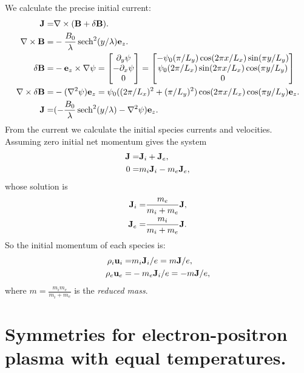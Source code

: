 \documentclass[12pt,fleqn]{article}
\numberwithin{equation}{section}
\begin{document}
We calculate the precise initial current:
\begin{align*}
     \mathbf{J} =& \nabla\times (\mathbf{B} + \delta\mathbf{B}).
\\ \nabla\times\mathbf{B} =& -\frac{B_0}{\lambda}\,\mathrm{sech}^2(y/\lambda) \mathbf{e}_z.
\\ \delta\mathbf{B}=&-\mathbf{e}_z\times\nabla \psi
   =  \begin{bmatrix}
        \partial_y \psi \\
       -\partial_x \psi \\
        0
      \end{bmatrix}
   =  \begin{bmatrix}
        -\psi_0(\pi/L_y) \cos(2\pi x/L_x) \sin(\pi y/L_y)  \\
         \psi_0(2\pi/L_x) \sin(2\pi x/L_x) \cos(\pi y/L_y) \\
        0
      \end{bmatrix}
\\ \nabla\times\delta\mathbf{B} =& -(\nabla^2\psi)\mathbf{e}_z
       =  \psi_0 ((2\pi/L_x)^2+(\pi/L_y)^2) \cos(2\pi x/L_x) \cos(\pi y/L_y)\mathbf{e}_z.
\\ \mathbf{J} =& (-\frac{B_0}{\lambda}\,\mathrm{sech}^2(y/\lambda) - \nabla^2 \psi) \mathbf{e}_z.
\end{align*}
From the current we calculate the initial species currents and
velocities.  Assuming zero initial net momentum gives the system
\begin{align*}
  \mathbf{J} =& \mathbf{J}_i + \mathbf{J}_e, \\
   0 =& m_i\mathbf{J}_i - m_e\mathbf{J}_e,
\end{align*}
whose solution is
\begin{align*}
  \mathbf{J}_i =& \frac{m_e}{m_i+m_e} \mathbf{J}, \\
  \mathbf{J}_e =& \frac{m_i}{m_i+m_e} \mathbf{J}.
\end{align*}
So the initial momentum of each species is:
\begin{align*}
  \rho_i\mathbf{u}_i =& m_i \mathbf{J}_i/e = m \mathbf{J}/e, \\
  \rho_e\mathbf{u}_e =& -m_e \mathbf{J}_i/e = -m \mathbf{J}/e,
\end{align*}
where
$m = \frac{m_i m_e}{m_i+m_e}$ is the \emph{reduced mass}.

\section{Symmetries for electron-positron plasma with equal temperatures.}
\end{document}

